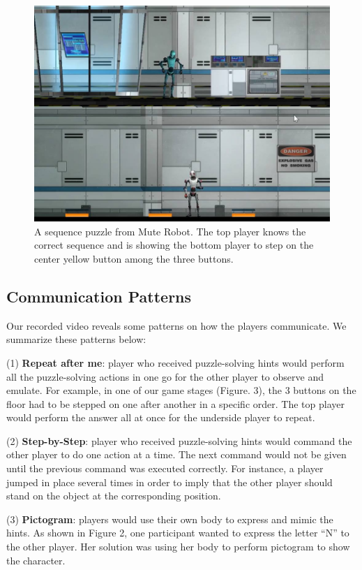 \documentclass{chi-ext}
\begin{document}
\begin{figure}
  \centering
  \includegraphics[width=0.8\linewidth]{figures/Figure2.jpg}
  \caption{A sequence puzzle from Mute Robot. The top player knows the correct sequence and is showing the bottom player to step on the center yellow button among the three buttons.}
  \label{fig:Figure2}
\end{figure}

\subsection{Communication Patterns}

 Our recorded video reveals some patterns on how the players communicate. We summarize these patterns below:

(1) {\bf Repeat after me}: player who received puzzle-solving hints would perform all the puzzle-solving actions in one go for the other player to observe and emulate. For example, in one of our game stages (Figure. 3), the 3 buttons on the floor had to be stepped on one after another in a specific order. The top player would perform the answer all at once for the underside player to repeat.

(2) {\bf Step-by-Step}: player who received puzzle-solving hints would command the other player to do one action at a time. The next command would not be given until the previous command was executed correctly. For instance, a player jumped in place several times in order to imply that the other player should stand on the object at the corresponding position.

(3) {\bf Pictogram}: players would use their own body to express and mimic the hints. As shown in Figure 2, one participant wanted to express the letter ``N'' to the other player. Her solution was using her body to perform pictogram to show the character.
\end{document}
